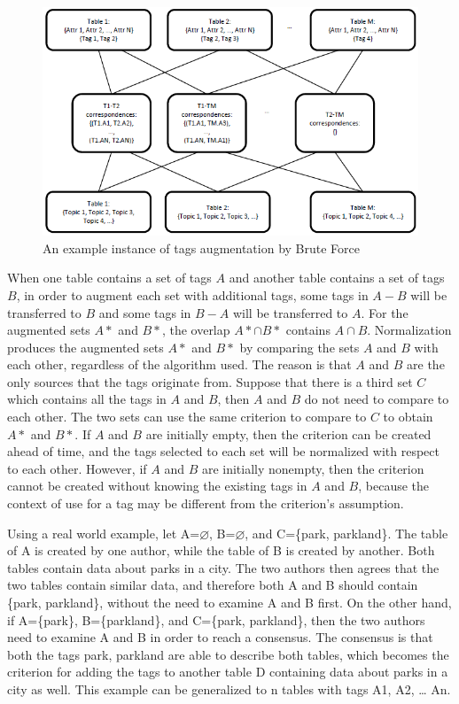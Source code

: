 \begin{figure}
    \centering
    \includegraphics[width=5in]{figures/an-example-instance-brute-force.png}
    \caption{An example instance of tags augmentation by Brute Force}
    \label{fig:an-example-instance-brute-force}
\end{figure}

When one table contains a set of tags $A$ and another table contains a set of tags $B$, in order to augment each set with additional tags, some tags in $A-B$ will be transferred to $B$ and some tags in $B-A$ will be transferred to $A$. For the augmented sets $A*$ and $B*$, the overlap $A*\cap B*$ contains $A\cap B$. Normalization produces the augmented sets $A*$ and $B*$ by comparing the sets $A$ and $B$ with each other, regardless of the algorithm used. The reason is that $A$ and $B$ are the only sources that the tags originate from. Suppose that there is a third set $C$ which contains all the tags in $A$ and $B$, then $A$ and $B$ do not need to compare to each other. The two sets can use the same criterion to compare to $C$ to obtain $A*$ and $B*$. If $A$ and $B$ are initially empty, then the criterion can be created ahead of time, and the tags selected to each set will be normalized with respect to each other. However, if $A$ and $B$ are initially nonempty, then the criterion cannot be created without knowing the existing tags in $A$ and $B$, because the context of use for a tag may be different from the criterion\textquoteright s assumption.

Using a real world example, let A=\ensuremath{\varnothing}, B=\ensuremath{\varnothing}, and C=\{park, parkland\}. The table of A is created by one author, while the table of B is created by another. Both tables contain data about parks in a city. The two authors then agrees that the two tables contain similar data, and therefore both A and B should contain \{park, parkland\}, without the need to examine A and B first. On the other hand, if A=\{park\}, B=\{parkland\}, and C=\{park, parkland\}, then the two authors need to examine A and B in order to reach a consensus. The consensus is that both the tags park, parkland are able to describe both tables, which becomes the criterion for adding the tags to another table D containing data about parks in a city as well. This example can be generalized to n tables with tags A1, A2, \dots{} An. 


